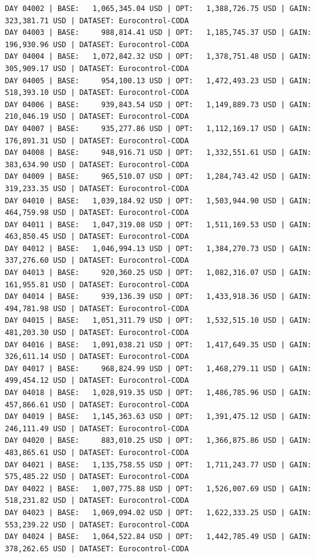 \documentclass[11pt,a4paper]{article}
\begin{document}
\begin{verbatim}
DAY 04002 | BASE:   1,065,345.04 USD | OPT:   1,388,726.75 USD | GAIN: 323,381.71 USD | DATASET: Eurocontrol-CODA
DAY 04003 | BASE:     988,814.41 USD | OPT:   1,185,745.37 USD | GAIN: 196,930.96 USD | DATASET: Eurocontrol-CODA
DAY 04004 | BASE:   1,072,842.32 USD | OPT:   1,378,751.48 USD | GAIN: 305,909.17 USD | DATASET: Eurocontrol-CODA
DAY 04005 | BASE:     954,100.13 USD | OPT:   1,472,493.23 USD | GAIN: 518,393.10 USD | DATASET: Eurocontrol-CODA
DAY 04006 | BASE:     939,843.54 USD | OPT:   1,149,889.73 USD | GAIN: 210,046.19 USD | DATASET: Eurocontrol-CODA
DAY 04007 | BASE:     935,277.86 USD | OPT:   1,112,169.17 USD | GAIN: 176,891.31 USD | DATASET: Eurocontrol-CODA
DAY 04008 | BASE:     948,916.71 USD | OPT:   1,332,551.61 USD | GAIN: 383,634.90 USD | DATASET: Eurocontrol-CODA
DAY 04009 | BASE:     965,510.07 USD | OPT:   1,284,743.42 USD | GAIN: 319,233.35 USD | DATASET: Eurocontrol-CODA
DAY 04010 | BASE:   1,039,184.92 USD | OPT:   1,503,944.90 USD | GAIN: 464,759.98 USD | DATASET: Eurocontrol-CODA
DAY 04011 | BASE:   1,047,319.08 USD | OPT:   1,511,169.53 USD | GAIN: 463,850.45 USD | DATASET: Eurocontrol-CODA
DAY 04012 | BASE:   1,046,994.13 USD | OPT:   1,384,270.73 USD | GAIN: 337,276.60 USD | DATASET: Eurocontrol-CODA
DAY 04013 | BASE:     920,360.25 USD | OPT:   1,082,316.07 USD | GAIN: 161,955.81 USD | DATASET: Eurocontrol-CODA
DAY 04014 | BASE:     939,136.39 USD | OPT:   1,433,918.36 USD | GAIN: 494,781.98 USD | DATASET: Eurocontrol-CODA
DAY 04015 | BASE:   1,051,311.79 USD | OPT:   1,532,515.10 USD | GAIN: 481,203.30 USD | DATASET: Eurocontrol-CODA
DAY 04016 | BASE:   1,091,038.21 USD | OPT:   1,417,649.35 USD | GAIN: 326,611.14 USD | DATASET: Eurocontrol-CODA
DAY 04017 | BASE:     968,824.99 USD | OPT:   1,468,279.11 USD | GAIN: 499,454.12 USD | DATASET: Eurocontrol-CODA
DAY 04018 | BASE:   1,028,919.35 USD | OPT:   1,486,785.96 USD | GAIN: 457,866.61 USD | DATASET: Eurocontrol-CODA
DAY 04019 | BASE:   1,145,363.63 USD | OPT:   1,391,475.12 USD | GAIN: 246,111.49 USD | DATASET: Eurocontrol-CODA
DAY 04020 | BASE:     883,010.25 USD | OPT:   1,366,875.86 USD | GAIN: 483,865.61 USD | DATASET: Eurocontrol-CODA
DAY 04021 | BASE:   1,135,758.55 USD | OPT:   1,711,243.77 USD | GAIN: 575,485.22 USD | DATASET: Eurocontrol-CODA
DAY 04022 | BASE:   1,007,775.88 USD | OPT:   1,526,007.69 USD | GAIN: 518,231.82 USD | DATASET: Eurocontrol-CODA
DAY 04023 | BASE:   1,069,094.02 USD | OPT:   1,622,333.25 USD | GAIN: 553,239.22 USD | DATASET: Eurocontrol-CODA
DAY 04024 | BASE:   1,064,522.84 USD | OPT:   1,442,785.49 USD | GAIN: 378,262.65 USD | DATASET: Eurocontrol-CODA

\end{verbatim}
\end{document}
